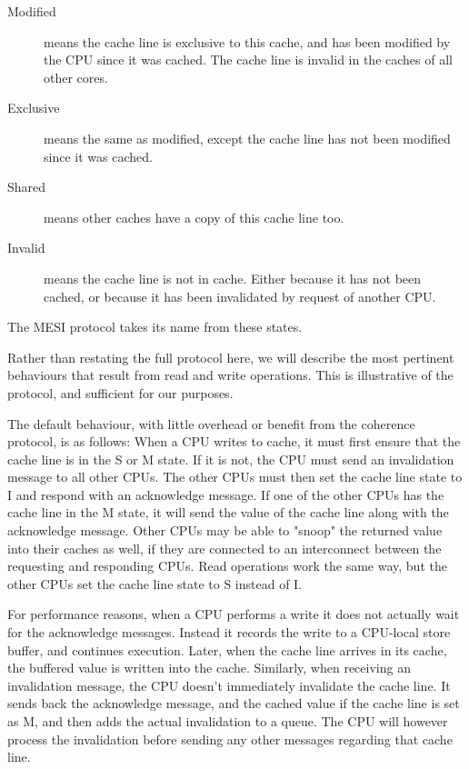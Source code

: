 \begin{description}
\item[Modified] means the cache line is exclusive to this cache, and has been
modified by the CPU since it was cached. The cache line is invalid in the caches of all other cores.
\item[Exclusive] means the same as modified, except the cache line has not been modified since it was cached.
\item[Shared] means other caches have a copy of this cache line too.
\item[Invalid] means the cache line is not in cache. Either because it has not
been cached, or because it has been invalidated by request of another CPU.
\end{description}

 The MESI protocol takes its name from these states.

Rather than restating the full protocol here, we will describe the most
pertinent behaviours that result from read and write operations. This is
illustrative of the protocol, and sufficient for our purposes.

The default behaviour, with little overhead or benefit from the coherence
protocol, is as follows: When a CPU writes to cache, it must first ensure that
the cache line is in the S or M state. If it is not, the CPU must send an
invalidation message to all other CPUs. The other CPUs must then set the cache
line state to I and respond with an acknowledge message. If one of the other
CPUs has the cache line in the M state, it will send the value of the cache line
along with the acknowledge message. Other CPUs may be able to "snoop" the
returned value into their caches as well, if they are connected to an
interconnect between the requesting and responding CPUs. Read operations work
the same way, but the other CPUs set the cache line state to S instead of I.

For performance reasons, when a CPU performs a write it does not actually wait
for the acknowledge messages. Instead it records the write to a CPU-local store
buffer, and continues execution. Later, when the cache line arrives in its
cache, the buffered value is written into the cache. Similarly, when receiving
an invalidation message, the CPU doesn't immediately invalidate the cache line.
It sends back the acknowledge message, and the cached value if the cache line is
set as M, and then adds the actual invalidation to a queue. The CPU will however
process the invalidation before sending any other messages regarding that cache
line\cite{mckenny-barriers}.

